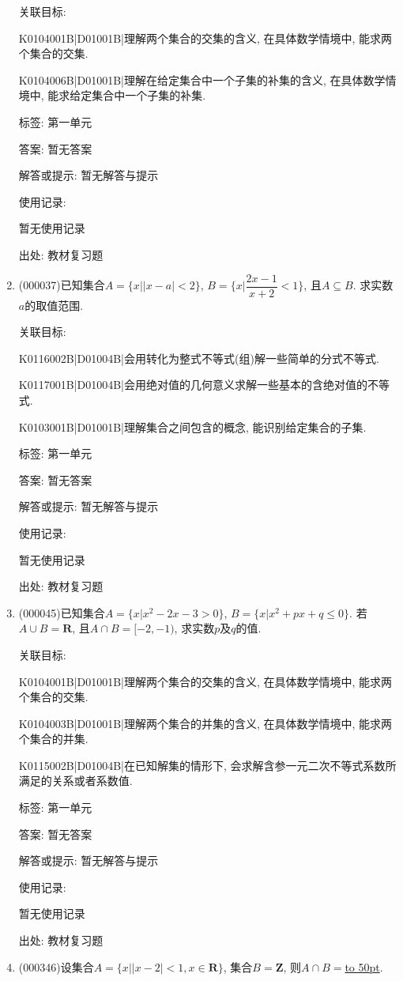 \documentclass[10pt,a4paper]{article}
\newcommand{\blank}[1]{\underline{\hbox to #1pt{}}}
\begin{document}
\begin{enumerate}[1.]
关联目标:

K0104001B|D01001B|理解两个集合的交集的含义, 在具体数学情境中, 能求两个集合的交集.

K0104006B|D01001B|理解在给定集合中一个子集的补集的含义, 在具体数学情境中, 能求给定集合中一个子集的补集.



标签: 第一单元

答案: 暂无答案

解答或提示: 暂无解答与提示

使用记录:

暂无使用记录


出处: 教材复习题
\item { (000037)}已知集合$A=\{x||x-a|<2\}$, $B=\{x|\dfrac{2x-1}{x+2}<1\}$, 且$A\subseteq B$. 求实数$a$的取值范围.


关联目标:

K0116002B|D01004B|会用转化为整式不等式(组)解一些简单的分式不等式.

K0117001B|D01004B|会用绝对值的几何意义求解一些基本的含绝对值的不等式.

K0103001B|D01001B|理解集合之间包含的概念, 能识别给定集合的子集.



标签: 第一单元

答案: 暂无答案

解答或提示: 暂无解答与提示

使用记录:

暂无使用记录


出处: 教材复习题
\item { (000045)}已知集合$A=\{x|x^2-2x-3>0\}$, $B=\{x|x^2+px+q\le 0\}$. 若$A\cup B=\mathbf{R}$, 且$A\cap B=[-2,-1)$, 求实数$p$及$q$的值.


关联目标:

K0104001B|D01001B|理解两个集合的交集的含义, 在具体数学情境中, 能求两个集合的交集.

K0104003B|D01001B|理解两个集合的并集的含义, 在具体数学情境中, 能求两个集合的并集.

K0115002B|D01004B|在已知解集的情形下, 会求解含参一元二次不等式系数所满足的关系或者系数值.



标签: 第一单元

答案: 暂无答案

解答或提示: 暂无解答与提示

使用记录:

暂无使用记录


出处: 教材复习题
\item { (000346)}设集合$A=\{x||x-2|<1,x\in \mathbf{R}\}$, 集合$B=\mathbf{Z}$, 则$A\cap B=$\blank{50}.



\end{enumerate}
\end{document}
